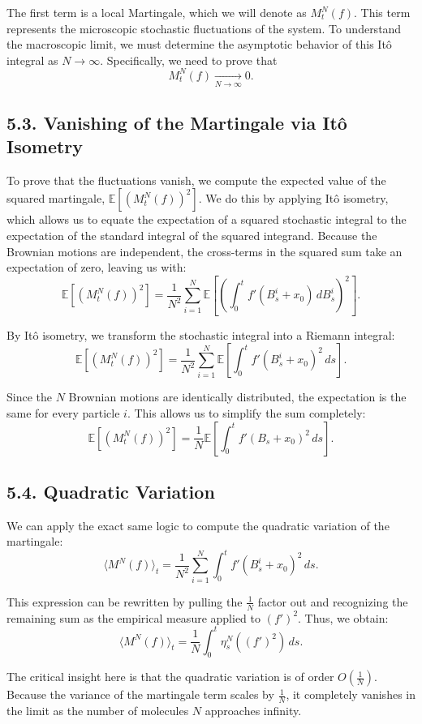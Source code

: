 \documentclass[11pt]{article}
\theoremstyle{definition}
\theoremstyle{remark}
\begin{document}
The first term is a local Martingale, which we will denote as $M_t^N(f)$. This term represents the microscopic stochastic fluctuations of the system. To understand the macroscopic limit, we must determine the asymptotic behavior of this It\^o integral as $N\to\infty$. Specifically, we need to prove that
\[
M_t^N(f)\xrightarrow[N\to\infty]{}0.
\]

\subsection*{5.3. Vanishing of the Martingale via It\^o Isometry}
To prove that the fluctuations vanish, we compute the expected value of the squared martingale, $\mathbb E[(M_t^N(f))^2]$. We do this by applying It\^o isometry, which allows us to equate the expectation of a squared stochastic integral to the expectation of the standard integral of the squared integrand. Because the Brownian motions are independent, the cross-terms in the squared sum take an expectation of zero, leaving us with:
\[
\mathbb E[(M_t^N(f))^2]
=
\frac{1}{N^2}\sum_{i=1}^N
\mathbb E\!\left[
\left(\int_0^t f'(B_s^i+x_0)\,dB_s^i\right)^2
\right].
\]

By It\^o isometry, we transform the stochastic integral into a Riemann integral:
\[
\mathbb E[(M_t^N(f))^2]
=
\frac{1}{N^2}\sum_{i=1}^N
\mathbb E\!\left[
\int_0^t f'(B_s^i+x_0)^2\,ds
\right].
\]

Since the $N$ Brownian motions are identically distributed, the expectation is the same for every particle $i$. This allows us to simplify the sum completely:
\[
\mathbb E[(M_t^N(f))^2]
=
\frac{1}{N}
\mathbb E\!\left[
\int_0^t f'(B_s+x_0)^2\,ds
\right].
\]

\subsection*{5.4. Quadratic Variation}
We can apply the exact same logic to compute the quadratic variation of the martingale:
\[
\langle M^N(f)\rangle_t
=
\frac{1}{N^2}\sum_{i=1}^N
\int_0^t f'(B_s^i+x_0)^2\,ds.
\]

This expression can be rewritten by pulling the $\frac{1}{N}$ factor out and recognizing the remaining sum as the empirical measure applied to $(f')^2$. Thus, we obtain:
\[
\langle M^N(f)\rangle_t
=
\frac{1}{N}\int_0^t \eta_s^N((f')^2)\,ds.
\]

The critical insight here is that the quadratic variation is of order $O\!\left(\frac{1}{N}\right)$. Because the variance of the martingale term scales by $\frac{1}{N}$, it completely vanishes in the limit as the number of molecules $N$ approaches infinity.
\end{document}
